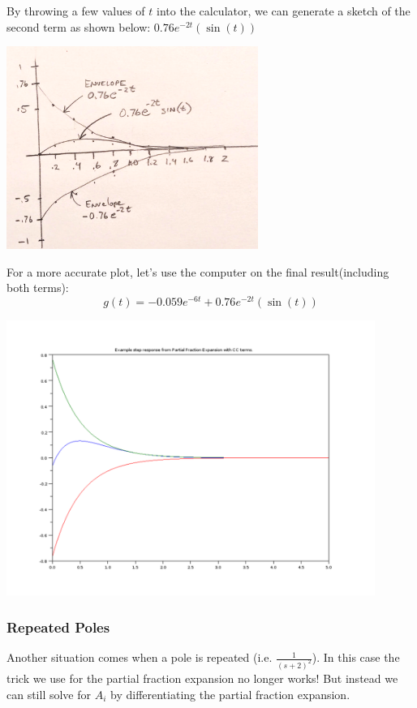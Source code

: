 \begin{ExampleCont}
By throwing a few values of $t$ into the calculator, we can generate a sketch of the second term as shown below:
$ 0.76e^{-2t} \left (  \sin(t)  \right )$

\includegraphics[width=82mm]{figs01/J55Q14.png}

For a more accurate plot, let's use the computer on the final result(including both terms):
\[
g(t) = -0.059e^{-6t} + 0.76e^{-2t} \left (  \sin(t)  \right )
\]

\includegraphics[width=120mm]{figs01/pf_compConja.png}


\end{ExampleCont}

\subsubsection{Repeated Poles}

Another situation comes when a pole is repeated (i.e. $\frac{1}{(s+2)^2}$).  In this case the trick we use for the partial fraction expansion no longer works!   But instead we can still solve for $A_i$ by differentiating the partial fraction expansion.

